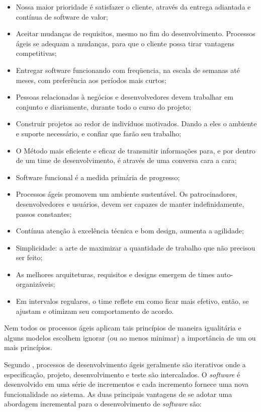 \begin{itemize}
    \item Nossa maior prioridade é satisfazer o cliente, através da entrega adiantada e contínua de software de valor;
    \item Aceitar mudanças de requisitos, mesmo no fim do desenvolvimento. Processos ágeis se adequam a mudanças, para que o cliente possa tirar vantagens competitivas;
    \item Entregar software funcionando com freqüencia, na escala de semanas até meses, com preferência aos períodos mais curtos;
    \item Pessoas relacionadas à negócios e desenvolvedores devem trabalhar em conjunto e diariamente, durante todo o curso do projeto;
    \item Construir projetos ao redor de indivíduos motivados. Dando a eles o ambiente e suporte necessário, e confiar que farão seu trabalho;
    \item O Método mais eficiente e eficaz de transmitir informações para, e por dentro de um time de desenvolvimento, é através de uma conversa cara a cara;
    \item Software funcional é a medida primária de progresso;
    \item Processos ágeis promovem um ambiente sustentável. Os patrocinadores, desenvolvedores e usuários, devem ser capazes de manter indefinidamente, passos constantes;
    \item Contínua atenção à excelência técnica e bom design, aumenta a agilidade;
    \item Simplicidade: a arte de maximizar a quantidade de trabalho que não precisou ser feito;
    \item As melhores arquiteturas, requisitos e designs emergem de times auto-organizáveis;
    \item Em intervalos regulares, o time reflete em como ficar mais efetivo, então, se ajustam e otimizam seu comportamento de acordo.
\end{itemize}

Nem todos os processos ágeis aplicam tais princípios de maneira igualitária e alguns modelos escolhem ignorar (ou ao menos minimar) a importância de um ou mais princípios. \cite{pressman_2009}

Segundo \cite{sommerville_2006}, processos de desenvolvimento ágeis geralmente são iterativos onde a
especificação, projeto, desenvolvimento e teste são intercalados. O \textit{software} é desenvolvido
em uma série de incrementos e cada incremento fornece uma nova funcionalidade ao sistema. As duas principais
vantagens de se adotar uma abordagem incremental para o desenvolvimento de \textit{software} são:

